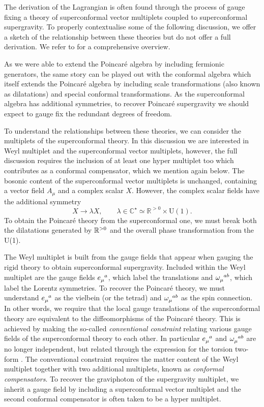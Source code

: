 The derivation of the Lagrangian  is often found through the process of gauge fixing a theory of superconformal vector multiplets coupled to superconformal supergravity. To properly contextualise some of the following discussion, we offer a sketch of the relationship between these theories but do not offer a full derivation. We refer to \cite{Mohaupt:2000mj, Freedman:2012zz} for a comprehensive overview. 

As we were able to extend the Poincar\'e algebra by including fermionic generators, the same story can be played out with the conformal algebra which itself extends the Poincar\'e algebra by including scale transformations (also known as dilatations) and special conformal transformations. As the superconformal algebra has additional symmetries, to recover Poincar\'e supergravity we should expect to gauge fix the redundant degrees of freedom.

To understand the relationships between these theories, we can consider the multiplets of the superconformal theory. In this discussion we are interested in Weyl multiplet and the superconformal vector multiplets, however, the full discussion requires the inclusion of at least one hyper multiplet too which contributes as a conformal compensator, which we mention again below. The bosonic content of the superconformal vector multiplets is unchanged, containing a vector field $A_\mu$ and a complex scalar $X$. However, the complex scalar fields have the additional symmetry 
\begin{equation*}
	X \to \lambda X, \qquad \lambda \in \mathbb{C}^\star \simeq \mathbb{R}^{> 0} \times \text{U}(1).
\end{equation*}
To obtain the Poincar\'e theory from the superconformal one, we must break both the dilatations generated by ${\mathbb{R}}^{> 0}$ and the overall phase transformation from the U(1).

The Weyl multiplet is built from the gauge fields that appear when gauging the rigid theory to obtain superconformal supergravity. Included within the Weyl multiplet are the gauge fields $\tensor{e}{_\mu^a}$, which label the translations and $\tensor{\omega}{_\mu^{ab}}$, which label the Lorentz symmetries. To recover the Poincar\'e theory, we must understand $\tensor{e}{_\mu^a}$ as the vielbein (or the tetrad) and $\tensor{\omega}{_\mu^{ab}}$ as the spin connection. In other words, we require that the local gauge translations of the superconformal theory are equivalent to the diffeomorphisms of the Poincar\'e theory. This is achieved by making the so-called \emph{conventional constraint} relating various gauge fields of the superconformal theory to each other. In particular $\tensor{e}{_\mu^a}$ and $\tensor{\omega}{_\mu^{ab}}$ are no longer independent, but related through the expression for the torsion two-form \cite{Gibbons:lecturenotes}. The conventional constraint requires the matter content of the Weyl multiplet together with two additional multiplets, known as \emph{conformal compensators}. To recover the graviphoton of the supergravity multiplet, we inherit a gauge field by including a superconformal vector multiplet and the second conformal compensator is often taken to be a hyper multiplet.

